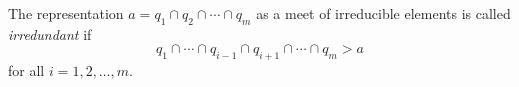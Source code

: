 The representation $a = q_1 \cap q_2 \cap \cdots \cap q_m$ as a meet of irreducible elements is called \textit{irredundant} if
$$q_1 \cap \cdots \cap q_{i-1} \cap q_{i+1} \cap \cdots \cap q_m > a$$
for all $i = 1, 2, \dots, m$.
